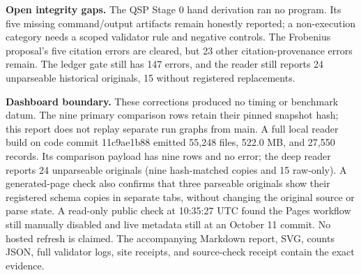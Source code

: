 \documentclass[10pt]{article}
\begin{document}
\textbf{Open integrity gaps.} The QSP Stage 0 hand derivation ran no program.
Its five missing command/output artifacts remain honestly reported; a
non-execution category needs a scoped validator rule and negative controls.
The Frobenius proposal's five citation errors are cleared, but 23 other
citation-provenance errors remain. The ledger gate still has 147 errors, and the reader still reports 24
unparseable historical originals, 15 without registered replacements.

\textbf{Dashboard boundary.} These corrections produced no timing or
benchmark datum. The nine primary comparison rows retain their pinned
snapshot hash; this report does not replay separate run graphs from main.
A full local reader build on code commit 11c9ae1b88 emitted 55,248 files,
522.0 MB, and 27,550 records. Its comparison payload has nine rows and no
error; the deep reader reports 24 unparseable originals (nine hash-matched
copies and 15 raw-only). A generated-page check also confirms that three
parseable originals show their registered schema copies in separate tabs,
without changing the original source or parse state. A read-only public check at 10:35:27 UTC found the
Pages workflow still manually disabled and live metadata still at an
October 11 commit. No hosted refresh is claimed. The accompanying Markdown
report, SVG, counts JSON, full validator logs, site receipts, and source-check
receipt contain the exact evidence.
\end{document}
